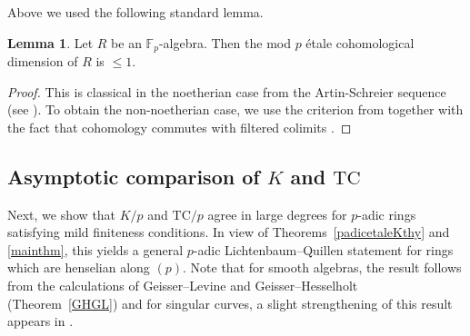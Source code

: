\documentclass{amsart}
\theoremstyle{definition}
\newtheorem{lemma}[definition]{Lemma}
\newcommand{\TC}{\mathrm{TC}}
\begin{document}
Above we used the following standard lemma.

\begin{lemma} 
\label{finiteetale}
Let $R$ be an $\mathbb{F}_p$-algebra. Then the mod $p$ \'etale cohomological
dimension of $R$ is $\leq 1$. 
\end{lemma} 
\begin{proof} 
This is classical in the noetherian case from the Artin-Schreier sequence (see
\cite[Exp.~X, Thm.~5.1]{SGA4}). 
To obtain the non-noetherian case, we use the criterion from \cite[Exp. IX,
Prop.~5.5]{SGA4} together with the fact that cohomology commutes with filtered
colimits \cite[Tag 03Q4]{stacks-project}. 
\end{proof} 


\subsection{Asymptotic comparison of $K$ and $ \TC$}

Next, 
we show that $K/p$ and $\TC/p$ agree in large degrees for $p$-adic rings
satisfying mild finiteness conditions. 
In view of Theorems~\ref{padicetaleKthy} and \ref{mainthm}, this yields a general $p$-adic
Lichtenbaum--Quillen statement for rings which are henselian along $(p)$. 
Note that for smooth algebras, the result follows from the
calculations of Geisser--Levine and Geisser--Hesselholt (Theorem~\ref{GHGL}) and 
for singular curves, a slight strengthening of this result appears in
\cite{GHexc}. 
\end{document}
